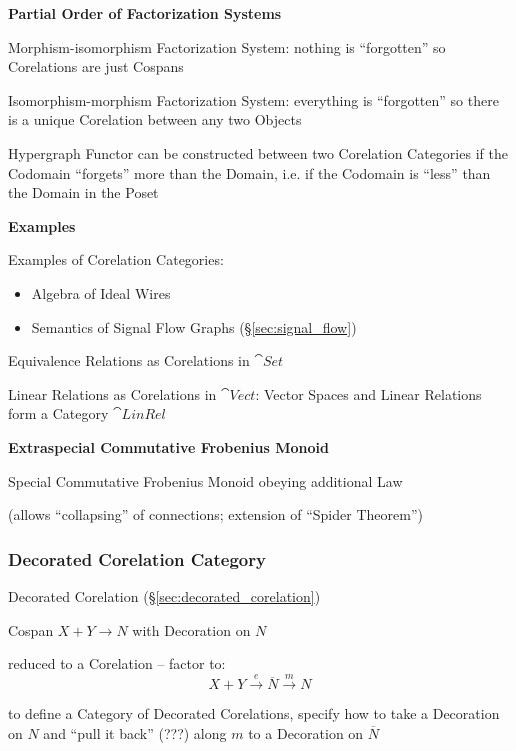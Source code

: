 \textbf{Partial Order of Factorization Systems} %

Morphism-isomorphism Factorization System: nothing is ``forgotten'' so
Corelations are just Cospans

Isomorphism-morphism Factorization System: everything is ``forgotten''
so there is a unique Corelation between any two Objects

Hypergraph Functor can be constructed between two Corelation
Categories if the Codomain ``forgets'' more than the Domain, i.e. if
the Codomain is ``less'' than the Domain in the Poset


\textbf{Examples}

Examples of Corelation Categories:
\begin{itemize}
  \item Algebra of Ideal Wires
  \item Semantics of Signal Flow Graphs (\S\ref{sec:signal_flow})
\end{itemize}

Equivalence Relations as Corelations in $\cat{Set}$ %

Linear Relations as Corelations in $\cat{Vect}$:
Vector Spaces and Linear Relations form a Category $\cat{LinRel}$


\textbf{Extraspecial Commutative Frobenius Monoid}

Special Commutative Frobenius Monoid obeying additional Law

(allows ``collapsing'' of connections; extension of ``Spider
Theorem'')



\subsubsection{Decorated Corelation Category}
\label{sec:decorated_corelation_category}

Decorated Corelation (\S\ref{sec:decorated_corelation})

Cospan $X + Y \rightarrow N$ with Decoration on $N$

reduced to a Corelation -- factor to:
\[
  X + Y \xrightarrow{e} \overline{N} \xrightarrow{m} N
\]

to define a Category of Decorated Corelations, specify how to take a
Decoration on $N$ and ``pull it back'' (???) along $m$ to a Decoration
on $\overline{N}$

